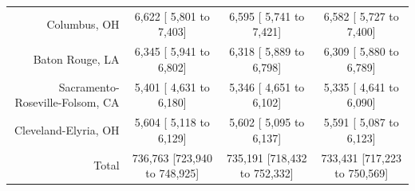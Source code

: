 \documentclass{article}
\begin{document}
\begin{table}[H]
\begin{tabular}{|r|c|c|c|}
		Columbus, OH &   6,622 [  5,801 to   7,403] &   6,595 [  5,741 to   7,421] &   6,582 [  5,727 to   7,400]\\
		Baton Rouge, LA &   6,345 [  5,941 to   6,802] &   6,318 [  5,889 to   6,798] &   6,309 [  5,880 to   6,789]\\
		Sacramento-Roseville-Folsom, CA &   5,401 [  4,631 to   6,180] &   5,346 [  4,651 to   6,102] &   5,335 [  4,641 to   6,090]\\
		Cleveland-Elyria, OH &   5,604 [  5,118 to   6,129] &   5,602 [  5,095 to   6,137] &   5,591 [  5,087 to   6,123]\\
		\hline
		Total & 736,763 [723,940 to 748,925] & 735,191 [718,432 to 752,332] & 733,431 [717,223 to 750,569]\\
		\hline
	\end{tabular}
\end{table}
\end{document}
